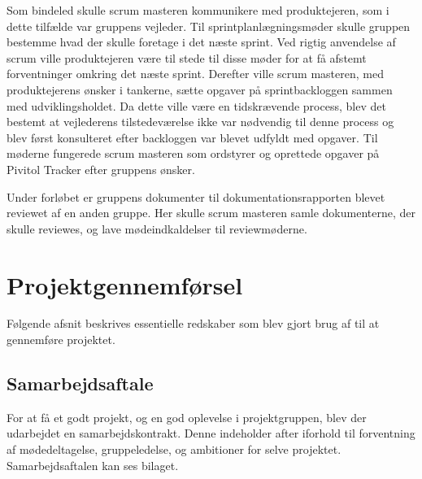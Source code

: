 Som bindeled skulle scrum masteren kommunikere med produktejeren, som i dette tilfælde var gruppens vejleder. Til sprintplanlægningsmøder skulle gruppen bestemme hvad der skulle foretage i det næste sprint. Ved rigtig anvendelse af scrum ville produktejeren være til stede til disse møder for at få afstemt forventninger omkring det næste sprint. Derefter ville scrum masteren, med produktejerens ønsker i tankerne, sætte opgaver på sprintbackloggen sammen med udviklingsholdet. Da dette ville være en tidskrævende process, blev det bestemt at vejlederens tilstedeværelse ikke var nødvendig til denne process og blev først konsulteret efter backloggen var blevet udfyldt med opgaver. Til møderne fungerede scrum masteren som ordstyrer og oprettede opgaver på Pivitol Tracker efter gruppens ønsker. \par 
Under forløbet er gruppens dokumenter til dokumentationsrapporten blevet reviewet af en anden gruppe. Her skulle scrum masteren samle dokumenterne, der skulle reviewes, og lave mødeindkaldelser til reviewmøderne.





\chapter{Projektgennemførsel}

Følgende afsnit beskrives essentielle redskaber som blev gjort brug af til at gennemføre projektet. 



\section{Samarbejdsaftale}
For at få et godt projekt, og en god oplevelse i projektgruppen, blev der udarbejdet en samarbejdskontrakt. Denne indeholder after iforhold til forventning af mødedeltagelse, gruppeledelse, og ambitioner for selve projektet. Samarbejdsaftalen kan ses bilaget.


